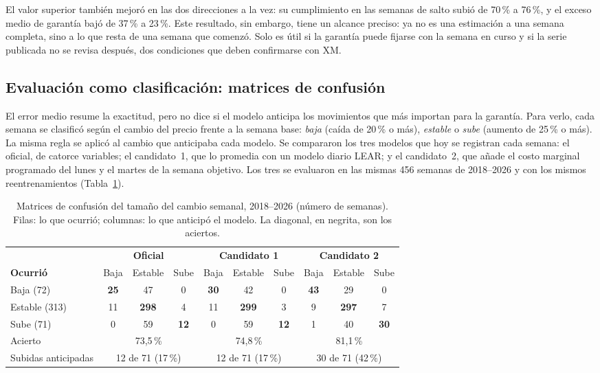 \documentclass[11pt,letterpaper]{article}
\begin{document}
El valor superior también mejoró en las dos direcciones a la vez: su
cumplimiento en las semanas de salto subió de 70\,\% a 76\,\%, y el
exceso medio de garantía bajó de 37\,\% a 23\,\%. Este resultado, sin
embargo, tiene un alcance preciso: ya no es una estimación a una semana
completa, sino a lo que resta de una semana que comenzó. Solo es útil si
la garantía puede fijarse con la semana en curso y si la serie publicada
no se revisa después, dos condiciones que deben confirmarse con XM.

\subsection{Evaluación como clasificación: matrices de confusión}

El error medio resume la exactitud, pero no dice si el modelo anticipa
los movimientos que más importan para la garantía. Para verlo, cada
semana se clasificó según el cambio del precio frente a la semana base:
\emph{baja} (caída de 20\,\% o más), \emph{estable} o \emph{sube}
(aumento de 25\,\% o más). La misma regla se aplicó al cambio que
anticipaba cada modelo. Se compararon los tres modelos que hoy se
registran cada semana: el oficial, de catorce variables; el candidato~1,
que lo promedia con un modelo diario LEAR; y el candidato~2, que añade el
costo marginal programado del lunes y el martes de la semana objetivo.
Los tres se evaluaron en las mismas 456 semanas de 2018--2026 y con los
mismos reentrenamientos (Tabla~\ref{tab:confusion}).

\begin{table}[H]
\centering
\caption{Matrices de confusión del tamaño del cambio semanal,
2018--2026 (número de semanas). Filas: lo que ocurrió; columnas: lo que
anticipó el modelo. La diagonal, en negrita, son los aciertos.}
\label{tab:confusion}
\small
\setlength{\tabcolsep}{3.5pt}
\begin{tabular}{@{}l ccc ccc ccc@{}}
\toprule
 & \multicolumn{3}{c}{\textbf{Oficial}} & \multicolumn{3}{c}{\textbf{Candidato 1}}
 & \multicolumn{3}{c}{\textbf{Candidato 2}} \\
\cmidrule(lr){2-4}\cmidrule(lr){5-7}\cmidrule(l){8-10}
\textbf{Ocurrió} & Baja & Estable & Sube & Baja & Estable & Sube & Baja & Estable & Sube \\
\midrule
Baja (72)     & \textbf{25} & 47 & 0 & \textbf{30} & 42 & 0 & \textbf{43} & 29 & 0 \\
Estable (313) & 11 & \textbf{298} & 4 & 11 & \textbf{299} & 3 & 9 & \textbf{297} & 7 \\
Sube (71)     & 0 & 59 & \textbf{12} & 0 & 59 & \textbf{12} & 1 & 40 & \textbf{30} \\
\midrule
Acierto       & \multicolumn{3}{c}{73,5\,\%} & \multicolumn{3}{c}{74,8\,\%} & \multicolumn{3}{c}{81,1\,\%} \\
Subidas anticipadas & \multicolumn{3}{c}{12 de 71 (17\,\%)} & \multicolumn{3}{c}{12 de 71 (17\,\%)}
 & \multicolumn{3}{c}{30 de 71 (42\,\%)} \\
\bottomrule
\end{tabular}
\end{table}
\end{document}
